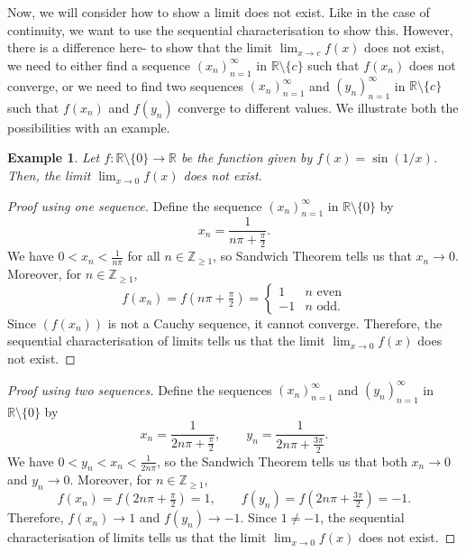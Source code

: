 \documentclass[a4paper, openany]{memoir}
\theoremstyle{definition}
\theoremstyle{plain}
\newtheorem{example}[definition]{Example}
\begin{document}
Now, we will consider how to show a limit does not exist. Like in the case of continuity, we want to use the sequential characterisation to show this. However, there is a difference here- to show that the limit $\lim_{x \to c} f(x)$ does not exist, we need to either find a sequence $(x_n)_{n=1}^{\infty}$ in $\mathbb{R} \setminus \{c\}$ such that $f(x_n)$ does not converge, or we need to find two sequences $(x_n)_{n=1}^{\infty}$ and $(y_n)_{n=1}^{\infty}$ in $\mathbb{R} \setminus \{c\}$ such that $f(x_n)$ and $f(y_n)$ converge to different values. We illustrate both the possibilities with an example.
\begin{example}
Let $f: \mathbb{R} \setminus \{0\} \to \mathbb{R}$ be the function given by $f(x) = \sin (1/x)$. Then, the limit $\lim_{x \to 0} f(x)$ does not exist.
\end{example}
\begin{proof}[Proof using one sequence]
Define the sequence $(x_n)_{n=1}^{\infty}$ in $\mathbb{R} \setminus \{0\}$ by 
\[x_n = \frac{1}{n\pi + \frac{\pi}{2}}.\]
We have $0 < x_n < \frac{1}{n\pi}$ for all $n \in \mathbb{Z}_{\geqslant 1}$, so Sandwich Theorem tells us that $x_n \to 0$. Moreover, for $n \in \mathbb{Z}_{\geqslant 1}$,
\[f(x_n) = f(n \pi + \tfrac{\pi}{2}) = \begin{cases}
1 & n \text{ even} \\
-1 & n \text{ odd}.
\end{cases}\]
Since $(f(x_n))$ is not a Cauchy sequence, it cannot converge. Therefore, the sequential characterisation of limits tells us that the limit $\lim_{x \to 0} f(x)$ does not exist.
\end{proof}
\begin{proof}[Proof using two sequences]
Define the sequences $(x_n)_{n=1}^{\infty}$ and $(y_n)_{n=1}^{\infty}$ in $\mathbb{R} \setminus \{0\}$ by
\[x_n = \frac{1}{2n \pi + \frac{\pi}{2}}, \qquad y_n = \frac{1}{2n \pi + \frac{3\pi}{2}}.\]
We have $0 < y_n < x_n < \frac{1}{2n \pi}$, so the Sandwich Theorem tells us that both $x_n \to 0$ and $y_n \to 0$. Moreover, for $n \in \mathbb{Z}_{\geqslant 1}$,
\[f(x_n) = f(2n \pi + \tfrac{\pi}{2}) = 1, \qquad f(y_n) = f(2n \pi + \tfrac{3\pi}{2}) = -1.\]
Therefore, $f(x_n) \to 1$ and $f(y_n) \to -1$. Since $1 \neq -1$, the sequential characterisation of limits tells us that the limit $\lim_{x \to 0} f(x)$ does not exist.
\end{proof}
\end{document}
